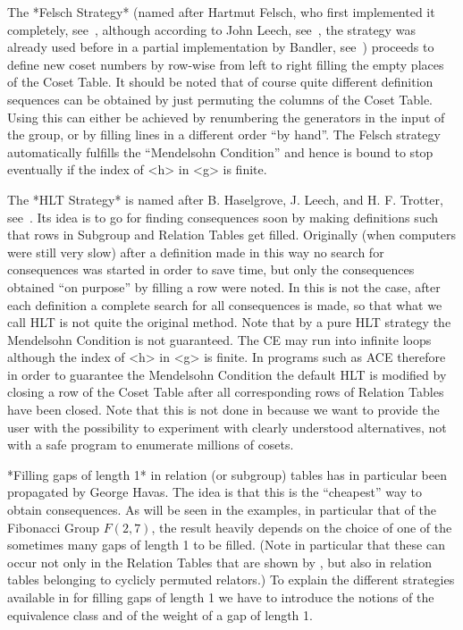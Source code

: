 The *Felsch Strategy* (named after Hartmut Felsch, who first
implemented it completely, see~\cite{Fel61}, although according to
John Leech, see~\cite{Lee84}, the strategy was already used before in
a partial implementation by Bandler, see~\cite{Ban56}) proceeds to
define new coset numbers by row-wise from left to right filling the
empty places of the Coset Table. It should be noted that of course
quite different definition sequences can be obtained by just permuting
the columns of the Coset Table. Using {\ITC} this can either be
achieved by renumbering the generators in the input of the group, or
by filling lines in a different order ``by hand''. The Felsch strategy
automatically fulfills the ``Mendelsohn Condition'' and hence is bound
to stop eventually if the index of <h> in <g> is finite.

The *HLT Strategy* is named after B. Haselgrove, J. Leech, and H. F.
Trotter, see~\cite{Lee84}. Its idea is to go for finding consequences
soon by making definitions such that rows in Subgroup and Relation
Tables get filled. Originally (when computers were still very slow)
after a definition made in this way no search for consequences was
started in order to save time, but only the consequences obtained ``on
purpose'' by filling a row were noted. In {\ITC} this is not the case,
after each definition a complete search for all consequences is made,
so that what we call HLT is not quite the original method. Note that
by a pure HLT strategy the Mendelsohn Condition is not guaranteed.
The CE may run into infinite loops although the index of <h> in <g> is
finite. In programs such as ACE therefore in order to guarantee the
Mendelsohn Condition the default HLT is modified by closing a row of
the Coset Table after all corresponding rows of Relation Tables have
been closed.
Note that this is not done in {\ITC} because we
want to provide the user with the possibility to experiment with
clearly understood alternatives, not with a safe program to enumerate
millions of cosets.

*Filling gaps of length 1* in relation (or subgroup) tables has in
particular been propagated by George Havas. The idea is that this is
the ``cheapest'' way to obtain consequences. As will be seen in the
examples, in particular that of the Fibonacci Group $F(2,7)$, the
result heavily depends on the choice of one of the sometimes many gaps
of length 1 to be filled. (Note in particular that these can occur
not only in the Relation Tables that are shown by {\ITC}, but also in
relation tables belonging to cyclicly permuted relators.) To explain
the different strategies available in {\ITC} for filling gaps of
length 1 we have to introduce the notions of the equivalence class
and of the weight of a gap of length 1.

